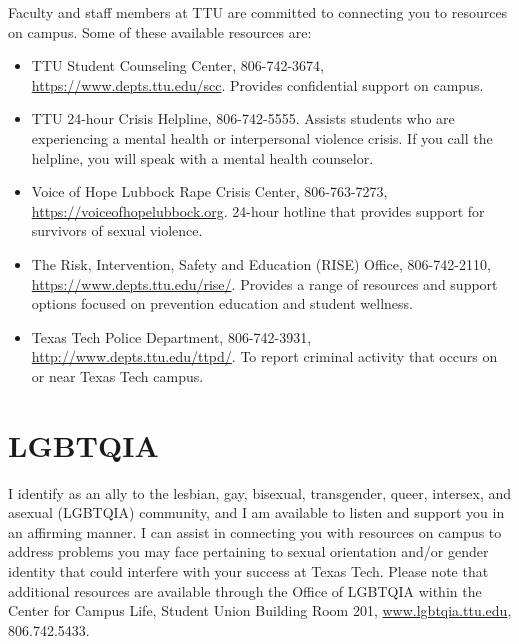 \documentclass[12pt, notitlepage]{article}   	%
\begin{document}
{Faculty and staff members at TTU are committed to connecting you to resources on campus. 
Some of these available resources are: 
\begin{itemize}
	\item{TTU Student Counseling Center, 806-742-3674, \url{https://www.depts.ttu.edu/scc}. 
		Provides confidential support on campus.} 
	\item{TTU 24-hour Crisis Helpline, 806-742-5555. 
		Assists students who are experiencing a mental health or interpersonal violence 
		crisis. If you call the helpline, you will speak with a mental health counselor.} 
	\item{Voice of Hope Lubbock Rape Crisis Center, 806-763-7273, 
		\url{https://voiceofhopelubbock.org}.
		24-hour hotline that provides support for survivors of sexual violence.} 
	\item{The Risk, Intervention, Safety and Education (RISE) Office, 806-742-2110, 
		\url{https://www.depts.ttu.edu/rise/}. Provides a range of resources and support 
		options focused on prevention education and student wellness.} 
	\item{Texas Tech Police Department, 806-742-3931, 
		\url{http://www.depts.ttu.edu/ttpd/}. 
		To report criminal activity that occurs on or near Texas Tech campus.}
\end{itemize}

\section{LGBTQIA}
I identify as an ally to the lesbian, gay, bisexual, transgender, queer, intersex, 
and asexual (LGBTQIA) community, and I am available to listen and support you in an 
affirming manner. I can assist in connecting you with resources on campus to address 
problems you may face pertaining to sexual orientation and/or gender identity that could 
interfere with your success at Texas Tech. Please note that additional resources are 
available through the Office of LGBTQIA within the Center for Campus Life, 
Student Union Building Room 201, 
\url{www.lgbtqia.ttu.edu}, 806.742.5433.

\newpage

}
\end{document}
